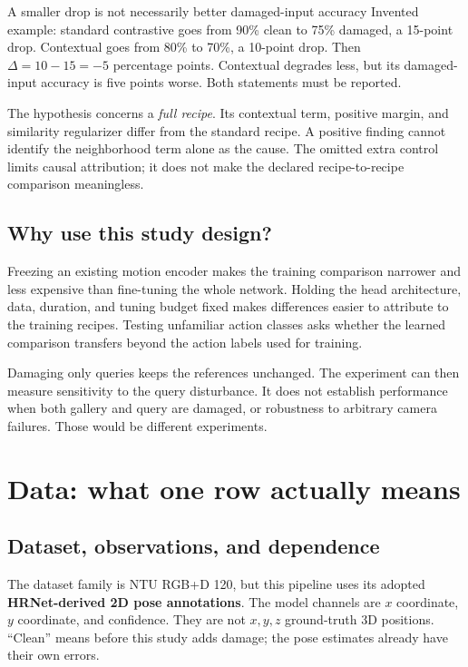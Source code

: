 \begin{concept}{A smaller drop is not necessarily better damaged-input accuracy}
Invented example: standard contrastive goes from 90\% clean to 75\% damaged,
a 15-point drop. Contextual goes from 80\% to 70\%, a 10-point drop.
Then $\Delta=10-15=-5$ percentage points. Contextual degrades less, but its
damaged-input accuracy is five points worse. Both statements must be reported.
\end{concept}

The hypothesis concerns a \emph{full recipe}. Its contextual term, positive
margin, and similarity regularizer differ from the standard recipe. A positive
finding cannot identify the neighborhood term alone as the cause. The omitted
extra control limits causal attribution; it does not make the declared
recipe-to-recipe comparison meaningless.

\subsection{Why use this study design?}
Freezing an existing motion encoder makes the training comparison narrower and
less expensive than fine-tuning the whole network. Holding the head architecture,
data, duration, and tuning budget fixed makes differences easier to attribute to
the training recipes. Testing unfamiliar action classes asks whether the learned
comparison transfers beyond the action labels used for training.

Damaging only queries keeps the references unchanged. The experiment can then
measure sensitivity to the query disturbance. It does not establish performance
when both gallery and query are damaged, or robustness to arbitrary camera
failures. Those would be different experiments.


\section{Data: what one row actually means}\label{sec:data}
\subsection{Dataset, observations, and dependence}
The dataset family is NTU RGB+D 120,\cite{ntu} but this pipeline uses its adopted
\textbf{HRNet-derived 2D pose annotations}. The model channels are $x$ coordinate,
$y$ coordinate, and confidence. They are not $x,y,z$ ground-truth 3D positions.
``Clean'' means before this study adds damage; the pose estimates already have
their own errors.

